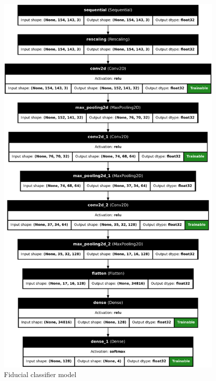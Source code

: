 \begin{figure}[H]
    \centering
    \includegraphics[height=.7\paperheight]{../photos/fiducial_classifier_model}
    \caption[originalRainbow]{Fiducial classifier model}
    \label{fig:fiducial_classifier_model}
\end{figure}
